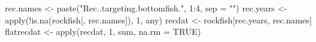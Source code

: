 \begin{Schunk}
\begin{Sinput}
 rec.names <- paste("Rec..targeting.bottomfish.", 1:4, sep = "")
 rec.years <- apply(!is.na(rockfish[, rec.names]), 1, any)
 recdat <- rockfish[rec.years, rec.names]
 flatrecdat <- apply(recdat, 1, sum, na.rm = TRUE)
\end{Sinput}
\end{Schunk}
